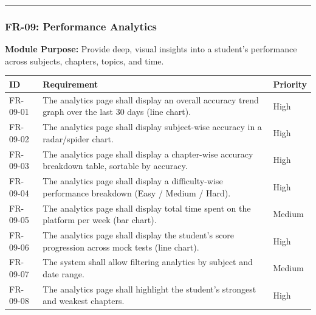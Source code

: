 \documentclass[
]{article}
\begin{document}
\begin{center}\rule{0.5\linewidth}{0.5pt}\end{center}

\subsubsection{FR-09: Performance
Analytics}\label{fr-09-performance-analytics}

\textbf{Module Purpose:} Provide deep, visual insights into a student's
performance across subjects, chapters, topics, and time.

\begin{longtable}[]{@{}
  >{\raggedright\arraybackslash}p{}
  >{\raggedright\arraybackslash}p{}
  >{\raggedright\arraybackslash}p{}@{}}
\toprule\noalign{}
\begin{minipage}[b]{\linewidth}\raggedright
ID
\end{minipage} & \begin{minipage}[b]{\linewidth}\raggedright
Requirement
\end{minipage} & \begin{minipage}[b]{\linewidth}\raggedright
Priority
\end{minipage} \\
\midrule\noalign{}
\endhead
\bottomrule\noalign{}
\endlastfoot
FR-09-01 & The analytics page shall display an overall accuracy trend
graph over the last 30 days (line chart). & High \\
FR-09-02 & The analytics page shall display subject-wise accuracy in a
radar/spider chart. & High \\
FR-09-03 & The analytics page shall display a chapter-wise accuracy
breakdown table, sortable by accuracy. & High \\
FR-09-04 & The analytics page shall display a difficulty-wise
performance breakdown (Easy / Medium / Hard). & High \\
FR-09-05 & The analytics page shall display total time spent on the
platform per week (bar chart). & Medium \\
FR-09-06 & The analytics page shall display the student's score
progression across mock tests (line chart). & High \\
FR-09-07 & The system shall allow filtering analytics by subject and
date range. & Medium \\
FR-09-08 & The analytics page shall highlight the student's strongest
and weakest chapters. & High \\
\end{longtable}
\end{document}
